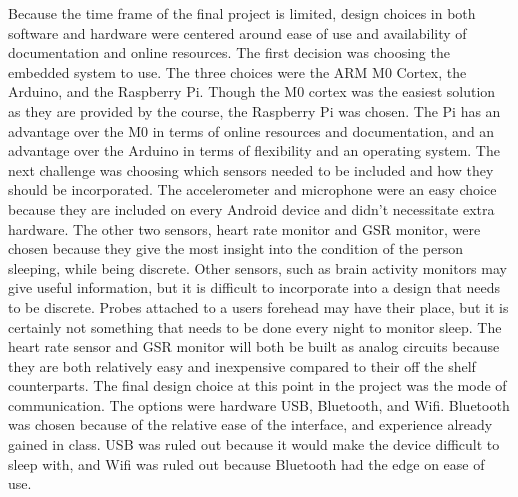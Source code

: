 \documentclass[finalProposal.tex]{subfiles}
\begin{document}
\onehalfspacing


\bigskip

Because the time frame of the final project is limited, design choices in both software and hardware were centered around ease of use and availability of documentation and online resources. 
The first decision was choosing the embedded system to use. The three choices were the ARM M0 Cortex, the Arduino, and the Raspberry Pi. Though the M0 cortex was the easiest solution as they are provided by the course, the Raspberry Pi was chosen. The Pi has an advantage over the M0 in terms of online resources and documentation, and an advantage over the Arduino in terms of flexibility and an operating system. The next challenge was choosing which sensors needed to be included and how they should be incorporated. The accelerometer and microphone were an easy choice because they are included on every Android device and didn't necessitate extra hardware. The other two sensors, heart rate monitor and GSR monitor, were chosen because they give the most insight into the condition of the person sleeping, while being discrete. Other sensors, such as brain activity monitors may give useful information, but it is difficult to incorporate into a design that needs to be discrete. Probes attached to a users forehead may have their place, but it is certainly not something that needs to be done every night to monitor sleep. The heart rate sensor and GSR monitor will both be built as analog circuits because they are both relatively easy and inexpensive compared to their off the shelf counterparts. The final design choice at this point in the project was the mode of communication. The options were hardware USB, Bluetooth, and Wifi. Bluetooth was chosen because of the relative ease of the interface, and experience already gained in class. USB was ruled out because it would make the device difficult to sleep with, and Wifi was ruled out because Bluetooth had the edge on ease of use.
\end{document}
